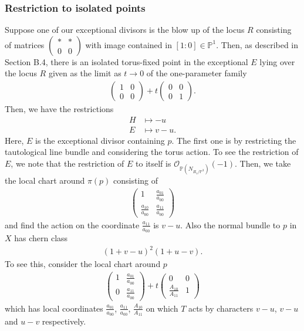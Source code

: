 \documentclass[12 pt, reqno]{amsart}
\theoremstyle{definition}
\newcommand{\mb}{\mathbb}
\newcommand{\ms}{\mathscr}
\begin{document}
\subsubsection{Restriction to isolated points}
Suppose one of our exceptional divisors is the blow up of the locus
$R$ consisting of matrices
$\begin{pmatrix} \ast & \ast \\ 0 & 0 \end{pmatrix}$ with image
contained in $[1:0]\in \mathbb{P}^1$. Then, as described in Section
B.4, there is an isolated torus-fixed point in the exceptional $E$
lying over the locus $R$ given as the limit as $t\rightarrow 0$ of the
one-parameter family
\begin{align*}
\begin{pmatrix}
1 & 0\\
0 & 0
\end{pmatrix}
+ t
\begin{pmatrix}
0 & 0\\
0 & 1 
\end{pmatrix}.
\end{align*}
Then, we have the restrictions
\begin{align*}
H&\mapsto -u\\
E&\mapsto v-u.
\end{align*}
Here, $E$ is the exceptional divisor containing $p$. The first one is
by restricting the tautological line bundle and considering the torus
action. To see the restriction of $E$, we note that the restriction of
$E$ to itself is $\ms{O}_{\mb{P}(N_{R_1/\mb{P}^3})}(-1)$. Then, we
take the local chart around $\pi(p)$ consisting of
\begin{align*}
\begin{pmatrix}
1 & \frac{a_{01}}{a_{00}}\\
\frac{a_{10}}{a_{00}} & \frac{a_{11}}{a_{00}}
\end{pmatrix}
\end{align*}
and find the action on the coordinate $\frac{a_{11}}{a_{00}}$ is
$v-u$. Also the normal bundle to $p$ in $X$ has chern class
\begin{align*}
(1+v-u)^2(1+u-v). 
\end{align*}
To see this, consider the local chart around $p$
\begin{align*}
\begin{pmatrix}
1 & \frac{a_{01}}{a_{00}}\\
0 & \frac{a_{11}}{a_{00}}
\end{pmatrix}
+ t
\begin{pmatrix}
0 & 0 \\
\frac{A_{10}}{A_{11}} & 1
\end{pmatrix}
\end{align*}
which has local coordinates $ \frac{a_{01}}{a_{00}}$,
$\frac{a_{11}}{a_{00}}$, $\frac{A_{10}}{A_{11}}$ on which $T$ acts by
characters $v-u$, $v-u$ and $u-v$ respectively.
\end{document}
